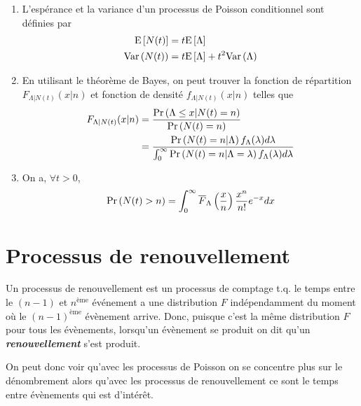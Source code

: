 \documentclass[10pt, french, landscape]{article}
\begin{document}
\begin{multicols*}{2}
\begin{enumerate}[label=(\arabic*)]
\item L'espérance et la variance d'un processus de Poisson conditionnel sont définies par
\begin{align*}
\mathrm{E} \left[ N(t) \right] & = t \mathrm{E} \left[ \Lambda \right] \\
\mathrm{Var} \left( N(t) \right) & =  t \mathrm{E} \left[ \Lambda \right] + t^2 \mathrm{Var} \left( \Lambda \right)
\end{align*}

\item En utilisant le théorème de Bayes, on peut trouver la fonction de répartition $F_{\Lambda | N(t)}(x | n)$ et fonction de densité $f_{\Lambda | N(t)}(x | n)$ telles que
\begin{align*}
F_{\Lambda | N(t)}(x | n)	& = \frac{\Pr \left( \Lambda \leq x | N(t) = n \right)}{\Pr \left( N(t) = n \right)} \\
& = \frac{\Pr \left( N(t) = n | \Lambda \right) f_\Lambda(\lambda) d \lambda}{\int_{0}^{\infty} \Pr \left( N(t) = n | \Lambda = \lambda \right) f_\Lambda(\lambda) d\lambda} \\
\end{align*}

\item On a, $\forall t > 0$,
\begin{align*}
\Pr \left( N(t) > n \right) = \int_{0}^{\infty} \overline{F}_{\Lambda}\left( \frac{x}{n} \right) \frac{x^n}{n!} e^{-x} dx
\end{align*}
\end{enumerate}

\section{Processus de renouvellement}

Un processus de renouvellement est un processus de comptage t.q. le temps entre le $(n - 1)$ et $n^{\text{ème}}$ événement a une distribution $F$ indépendamment du moment où le $(n-1)^{\text{ème}}$ évènement arrive. Donc, puisque c'est la même distribution $F$ pour tous les évènements, lorsqu'un évènement se produit on dit qu'un \textbf{\textit{renouvellement}} s'est produit.

On peut donc voir qu'avec les processus de Poisson on se concentre plus sur le dénombrement alors qu'avec les processus de renouvellement ce sont le temps entre évènements qui est d'intérêt.


\end{multicols*}
\end{document}
